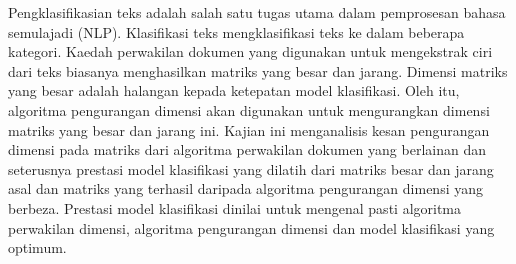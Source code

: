 Pengklasifikasian teks adalah salah satu tugas utama dalam pemprosesan bahasa semulajadi (NLP). Klasifikasi teks mengklasifikasi teks ke dalam beberapa kategori. Kaedah perwakilan dokumen yang digunakan untuk mengekstrak ciri dari teks biasanya menghasilkan matriks yang besar dan jarang. Dimensi matriks yang besar adalah halangan kepada ketepatan model klasifikasi. Oleh itu, algoritma pengurangan dimensi akan digunakan untuk mengurangkan dimensi matriks yang besar dan jarang ini. Kajian ini menganalisis kesan pengurangan dimensi pada matriks dari algoritma perwakilan dokumen yang berlainan dan seterusnya prestasi model klasifikasi yang dilatih dari matriks besar dan jarang asal dan matriks yang terhasil daripada algoritma pengurangan dimensi yang berbeza. Prestasi model klasifikasi dinilai untuk mengenal pasti algoritma perwakilan dimensi, algoritma pengurangan dimensi dan model klasifikasi yang optimum.
